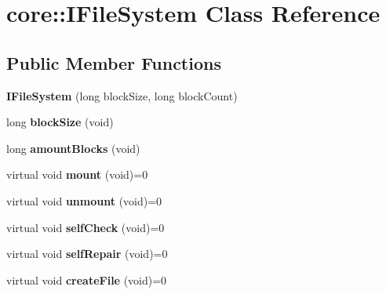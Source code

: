 \hypertarget{classcore_1_1_i_file_system}{}\section{core\+:\+:I\+File\+System Class Reference}
\label{classcore_1_1_i_file_system}
\subsection*{Public Member Functions}
\begin{DoxyCompactItemize}
\item 
\mbox{\label{classcore_1_1_i_file_system_a6ce2b2c38629462050b9ec53eda0a248}} 
{\bfseries I\+File\+System} (long block\+Size, long block\+Count)
\item 
\mbox{\label{classcore_1_1_i_file_system_a493334ffcc971d8319bd00a141dca6e5}} 
long {\bfseries block\+Size} (void)
\item 
\mbox{\label{classcore_1_1_i_file_system_abd457a1423ac45a0c2e1fb980120dbf5}} 
long {\bfseries amount\+Blocks} (void)
\item 
\mbox{\label{classcore_1_1_i_file_system_a00693ff330dde579f2ac4740903d9904}} 
virtual void {\bfseries mount} (void)=0
\item 
\mbox{\label{classcore_1_1_i_file_system_a1fc1e6c654103f93abcd307009b7b175}} 
virtual void {\bfseries unmount} (void)=0
\item 
\mbox{\label{classcore_1_1_i_file_system_a05a699c4bd1efafa91871b71d40dac7f}} 
virtual void {\bfseries self\+Check} (void)=0
\item 
\mbox{\label{classcore_1_1_i_file_system_a4c968735ba948b62fcd401b9a4d0d76b}} 
virtual void {\bfseries self\+Repair} (void)=0
\item 
\mbox{\label{classcore_1_1_i_file_system_a1c197a52cb302e708a961fedfd0f2b4f}} 
virtual void {\bfseries create\+File} (void)=0
\item 

\end{DoxyCompactItemize}
